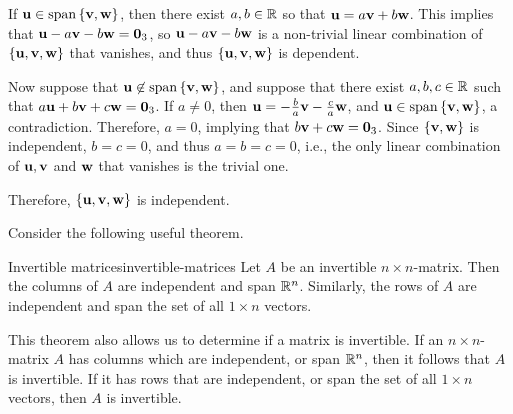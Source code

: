 \begin{solution}
If $\vect{u}\in\sspan\set{\vect{v},\vect{w}}$, then there exist $a,b\in\mathbb{R}$ so
that $\mbox{\bf u}=a\mbox{\bf v} + b\mbox{\bf w}$.
This implies that $\mbox{\bf u}-a\mbox{\bf v} - b\mbox{\bf w}=\mbox{\bf 0}_3$,
so  $\mbox{\bf u}-a\mbox{\bf v} - b\mbox{\bf w}$
is a non-trivial linear combination of $\left\{\mbox{\bf u},\mbox{\bf v},\mbox{\bf w}\right\}$ that
vanishes, 
and thus $\left\{\mbox{\bf u},\mbox{\bf v},\mbox{\bf w}\right\}$ is dependent.

Now suppose that $\vect{u}\not\in\sspan\set{\vect{v},\vect{w}}$, and suppose
that there exist $a,b,c\in\mathbb{R}$ such that
$a\mbox{\bf u}+b\mbox{\bf v}+c\mbox{\bf w}=\mbox{\bf 0}_3$.
If $a\neq 0$, then $\mbox{\bf u}=-\frac{b}{a}\mbox{\bf v}-\frac{c}{a}\mbox{\bf w}$,
and $\vect{u}\in\sspan\set{\vect{v},\vect{w}}$, a contradiction.
Therefore, $a=0$, implying that $b\mbox{\bf v}+c\mbox{\bf w}=\mbox{\bf 0}_3$.
Since $\left\{\mbox{\bf v},\mbox{\bf w}\right\}$ is independent, $b=c=0$, and thus
$a=b=c=0$, i.e., the only linear combination of 
$\mbox{\bf u},\mbox{\bf v}$ and $\mbox{\bf w}$ that vanishes is the trivial one.

Therefore, $\left\{\mbox{\bf u},\mbox{\bf v},\mbox{\bf w}\right\}$ is independent.
\end{solution}

Consider the following useful theorem.

\begin{theorem}{Invertible matrices}{invertible-matrices}
Let $A$ be an invertible $n \times n$-matrix. Then the columns of $A$ are independent and span $\mathbb{R}^n$. Similarly, the rows of $A$ are independent and span the set of all $1 \times n$ vectors. 
\end{theorem}

This theorem also allows us to determine if a matrix is invertible. If an $n \times n$-matrix $A$ has columns which are independent, or span $\mathbb{R}^n$, then it follows that $A$ is invertible. If it has rows that are independent, or span the set of all $1 \times n$ vectors, then $A$ is invertible.

